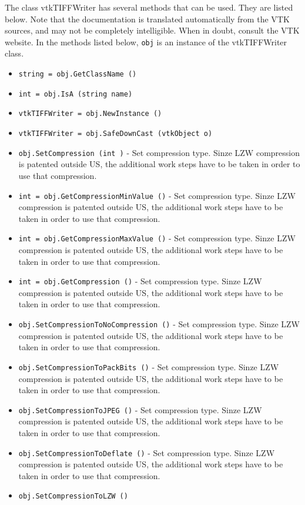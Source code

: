 The class vtkTIFFWriter has several methods that can be used.
  They are listed below.
Note that the documentation is translated automatically from the VTK sources,
and may not be completely intelligible.  When in doubt, consult the VTK website.
In the methods listed below, \verb|obj| is an instance of the vtkTIFFWriter class.
\begin{itemize}
\item  \verb|string = obj.GetClassName ()|

\item  \verb|int = obj.IsA (string name)|

\item  \verb|vtkTIFFWriter = obj.NewInstance ()|

\item  \verb|vtkTIFFWriter = obj.SafeDownCast (vtkObject o)|

\item  \verb|obj.SetCompression (int )| -  Set compression type. Sinze LZW compression is patented outside US, the
 additional work steps have to be taken in order to use that compression.

\item  \verb|int = obj.GetCompressionMinValue ()| -  Set compression type. Sinze LZW compression is patented outside US, the
 additional work steps have to be taken in order to use that compression.

\item  \verb|int = obj.GetCompressionMaxValue ()| -  Set compression type. Sinze LZW compression is patented outside US, the
 additional work steps have to be taken in order to use that compression.

\item  \verb|int = obj.GetCompression ()| -  Set compression type. Sinze LZW compression is patented outside US, the
 additional work steps have to be taken in order to use that compression.

\item  \verb|obj.SetCompressionToNoCompression ()| -  Set compression type. Sinze LZW compression is patented outside US, the
 additional work steps have to be taken in order to use that compression.

\item  \verb|obj.SetCompressionToPackBits ()| -  Set compression type. Sinze LZW compression is patented outside US, the
 additional work steps have to be taken in order to use that compression.

\item  \verb|obj.SetCompressionToJPEG ()| -  Set compression type. Sinze LZW compression is patented outside US, the
 additional work steps have to be taken in order to use that compression.

\item  \verb|obj.SetCompressionToDeflate ()| -  Set compression type. Sinze LZW compression is patented outside US, the
 additional work steps have to be taken in order to use that compression.

\item  \verb|obj.SetCompressionToLZW ()|

\end{itemize}
